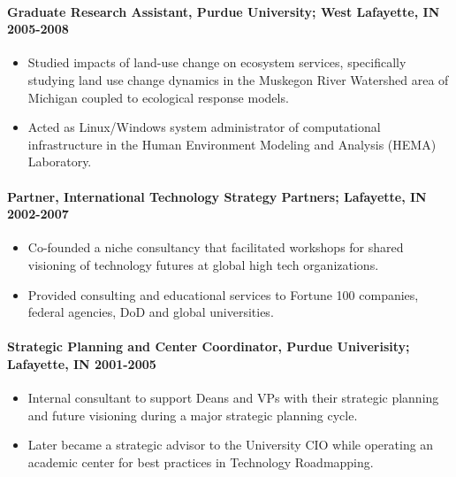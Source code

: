 \paragraph{Graduate Research Assistant, Purdue University; West
Lafayette, IN
\textbf{2005-2008}}\label{graduate-research-assistant-purdue-university-west-lafayette-in-2005-2008}

\begin{itemize}
\itemsep1pt\parskip0pt
\item
  Studied impacts of land-use change on ecosystem services, specifically
  studying land use change dynamics in the Muskegon River Watershed area
  of Michigan coupled to ecological response models.
\item
  Acted as Linux/Windows system administrator of computational
  infrastructure in the Human Environment Modeling and Analysis (HEMA)
  Laboratory.
\end{itemize}

\paragraph{Partner, International Technology Strategy Partners;
Lafayette, IN
\textbf{2002-2007}}\label{partner-international-technology-strategy-partners-lafayette-in-2002-2007}

\begin{itemize}
\itemsep1pt\parskip0pt
\item
  Co-founded a niche consultancy that facilitated workshops for shared
  visioning of technology futures at global high tech organizations.
\item
  Provided consulting and educational services to Fortune 100 companies,
  federal agencies, DoD and global universities.
\end{itemize}

\paragraph{Strategic Planning and Center Coordinator, Purdue
Univerisity; Lafayette, IN
\textbf{2001-2005}}\label{strategic-planning-and-center-coordinator-purdue-univerisity-lafayette-in-2001-2005}

\begin{itemize}
\itemsep1pt\parskip0pt
\item
  Internal consultant to support Deans and VPs with their strategic
  planning and future visioning during a major strategic planning cycle.
\item
  Later became a strategic advisor to the University CIO while operating
  an academic center for best practices in Technology Roadmapping.
\end{itemize}
